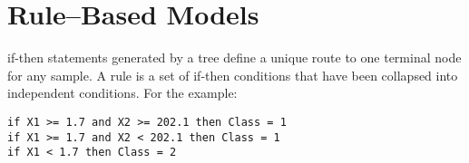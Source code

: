 


\section{Rule–Based Models}
if-then statements generated by a tree deﬁne a unique route to one
terminal node for any sample.
A rule is a set of if-then conditions that have been collapsed into
independent conditions.
For the example:
\begin{verbatim}
if X1 >= 1.7 and X2 >= 202.1 then Class = 1
if X1 >= 1.7 and X2 < 202.1 then Class = 1
if X1 < 1.7 then Class = 2
\end{verbatim}




